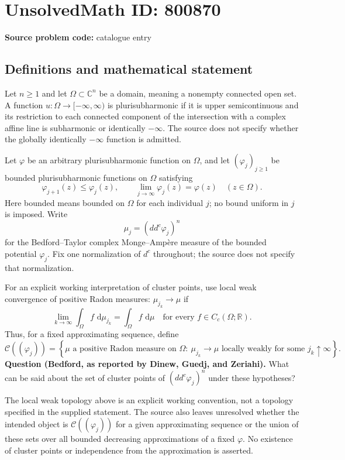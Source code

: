\documentclass[11pt]{article}
\newcommand{\R}{\mathbb{R}}
\newcommand{\C}{\mathbb{C}}
\newcommand{\dd}{\,\mathrm{d}}
\begin{document}
\section*{UnsolvedMath ID: 800870}
\textbf{Source problem code:} catalogue entry
\subsection{Definitions and mathematical statement}
Let \(n\geq 1\) and let \(\Omega\subset\C^n\) be a domain, meaning a nonempty connected open set. A function \(u:\Omega\to[-\infty,\infty)\) is plurisubharmonic if it is upper semicontinuous and its restriction to each connected component of the intersection with a complex affine line is subharmonic or identically \(-\infty\). The source does not specify whether the globally identically \(-\infty\) function is admitted.

Let \(\varphi\) be an arbitrary plurisubharmonic function on \(\Omega\), and let \((\varphi_j)_{j\geq1}\) be bounded plurisubharmonic functions on \(\Omega\) satisfying
\[
\varphi_{j+1}(z)\leq\varphi_j(z),\qquad \lim_{j\to\infty}\varphi_j(z)=\varphi(z)\quad(z\in\Omega).
\]
Here bounded means bounded on \(\Omega\) for each individual \(j\); no bound uniform in \(j\) is imposed. Write
\[
\mu_j=(dd^c\varphi_j)^n
\]
for the Bedford--Taylor complex Monge--Amp\`ere measure of the bounded potential \(\varphi_j\). Fix one normalization of \(d^c\) throughout; the source does not specify that normalization.

For an explicit working interpretation of cluster points, use local weak convergence of positive Radon measures: \(\mu_{j_k}\to\mu\) if
\[
\lim_{k\to\infty}\int_\Omega f\,\dd\mu_{j_k}=\int_\Omega f\,\dd\mu
\quad\text{for every }f\in C_c(\Omega;\R).
\]
Thus, for a fixed approximating sequence, define
\[
\mathcal C((\varphi_j))=\left\{\mu\text{ a positive Radon measure on }\Omega:\ \mu_{j_k}\to\mu\text{ locally weakly for some }j_k\uparrow\infty\right\}.
\]
\textbf{Question (Bedford, as reported by Dinew, Guedj, and Zeriahi).} What can be said about the set of cluster points of \((dd^c\varphi_j)^n\) under these hypotheses?

The local weak topology above is an explicit working convention, not a topology specified in the supplied statement. The source also leaves unresolved whether the intended object is \(\mathcal C((\varphi_j))\) for a given approximating sequence or the union of these sets over all bounded decreasing approximations of a fixed \(\varphi\). No existence of cluster points or independence from the approximation is asserted.
\end{document}

